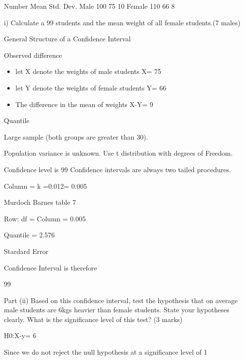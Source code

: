 \documentclass[12pt]{report}
\begin{document}
{Number
Mean
Std. Dev.
Male
100
75
10
Female
110
66
8

i)        Calculate a 99%
students and the mean weight of all female students.(7 males)

General Structure of a Confidence Interval





Observed difference

\begin{itemize}
\item let X denote the weights of male students    X= 75
\item let Y denote the weights of female students  Y= 66
\item The difference in the mean of weights X-Y= 9
\end{itemize}


Quantile

Large sample (both groups are greater than 30).

Population variance is unknown.
Use t distribution with  degrees of Freedom.


Confidence level is 99%
Confidence intervals are always two tailed procedures.


Column = k =0.012= 0.005


Murdoch Barnes table 7


Row: df =  
Column = 0.005

Quantile =  2.576 


Stardard Error






Confidence Interval is therefore

99%


Part (ii)
Based on this confidence interval, test the hypothesis that on average male students are 6kgs heavier than female students.
State your hypotheses clearly. What is the significance level of this test?   (3 marks)

H0:X-y= 6




Since  we do not reject the null hypothesis at a significance level of 1%





}
\end{document}
